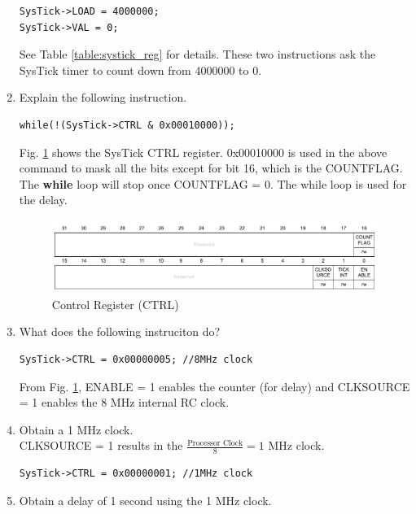 \begin{enumerate}[label=\arabic*.,ref=\theenumi]
\begin{lstlisting}
SysTick->LOAD = 4000000;
SysTick->VAL = 0;
\end{lstlisting}
\solution See Table \ref{table:systick_reg} for details.  These two instructions ask the SysTick timer to count down from 4000000 to 0.  
\item Explain the following instruction.
\begin{lstlisting}
while(!(SysTick->CTRL & 0x00010000));
\end{lstlisting}
\solution Fig. \ref{fig:systick_ctrl} shows the SysTick CTRL register.    0x00010000 is used in the above command to mask all the bits except for bit 16, which
is the COUNTFLAG.  The \textbf{while} loop will stop once COUNTFLAG = 0. The while loop is used for the delay.
\begin{figure}[!ht]
\begin{center}
\includegraphics[width=\columnwidth]{stm32/timers/figs/systick_ctrl}
\end{center}
\caption{Control Register (CTRL)}
\label{fig:systick_ctrl}
\end{figure}
\item What does the following instruciton do?
\begin{lstlisting}
SysTick->CTRL = 0x00000005;	//8MHz clock
\end{lstlisting}
\solution From Fig. \ref{fig:systick_ctrl}, ENABLE = 1 enables the counter (for delay) and CLKSOURCE = 1 enables the 8 MHz internal RC clock.
\item Obtain a 1 MHz clock. 
\\
\solution CLKSOURCE = 1 results in the $\frac{\text{Processor Clock}}{8} = 1$ MHz clock.
\begin{lstlisting}
SysTick->CTRL = 0x00000001;	//1MHz clock
\end{lstlisting}
\item Obtain a delay of 1 second using the 1 MHz clock.

\end{enumerate}
